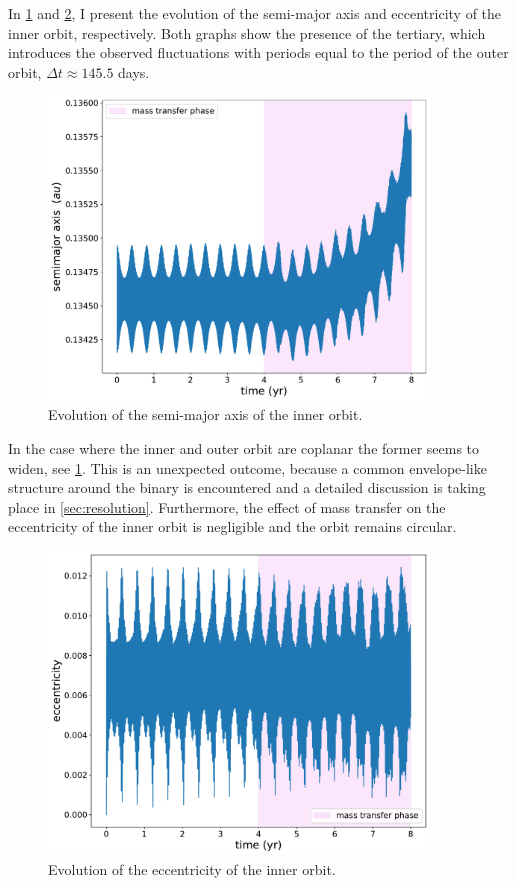 In \cref{fig:accretion_inc_00_inner_semimajor_axis} and \cref{fig:accretion_inc_00_inner_ecc}, I present the evolution of the semi-major axis and eccentricity of the inner orbit, 
respectively. Both graphs show the presence of the tertiary, which introduces the observed fluctuations with periods equal to the period of the outer orbit, $\Delta t \approx 145.5$ days.
\begin{figure}[H]
    \centering
    \includegraphics[width=0.9\textwidth]{Thesis/graphs/inc_00/accretion_inc_00_inner_semimajor_axis.pdf}
    \caption{Evolution of the semi-major axis of the inner orbit.}
    \label{fig:accretion_inc_00_inner_semimajor_axis}
\end{figure}
In the case where the inner and outer orbit are coplanar the former seems to widen, see \cref{fig:accretion_inc_00_inner_semimajor_axis}. 
This is an unexpected outcome, because a common envelope-like structure around the binary is encountered and a detailed discussion is taking place in \cref{sec:resolution}. Furthermore, the effect of mass transfer on the eccentricity of the inner orbit is negligible and the orbit remains circular. 
\begin{figure}[!htb]
    \centering
    \includegraphics[width=0.9\textwidth]{Thesis/graphs/inc_00/accretion_inc_00_inner_ecc.pdf}
    \caption{Evolution of the eccentricity of the inner orbit.}
    \label{fig:accretion_inc_00_inner_ecc}
\end{figure}


